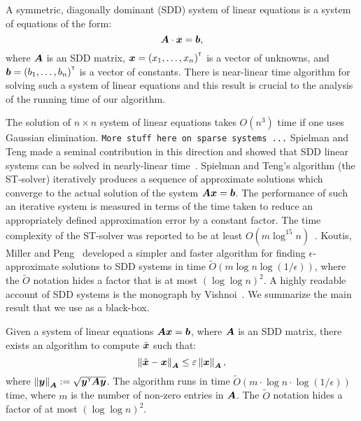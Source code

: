 A symmetric, diagonally dominant (SDD) system of linear equations is a system of 
equations of the form:
\[
	\boldsymbol{A} \cdot \boldsymbol{x} = \boldsymbol{b},
\]
where $\boldsymbol{A}$ is an SDD matrix, $\boldsymbol{x} = {(x_1, \ldots, x_n)}^{\scriptscriptstyle \mathsf{T}}$ 
is a vector of unknowns, and $\boldsymbol{b} = {(b_1, \ldots, b_n)}^{\scriptscriptstyle \mathsf{T}}$ is a vector of constants. 
There is near-linear time algorithm for solving such a system of linear equations 
and this result is crucial to the analysis of the running time of our algorithm. 

The solution of $n \times n$ system of linear equations takes $O(n^3)$ time 
if one uses Gaussian elimination. \texttt{More stuff here on sparse systems ...}
Spielman and Teng made a seminal contribution in this direction and 
showed that SDD linear systems can be solved in nearly-linear 
time~\cite{ST04,EEST05,ST08}. Spielman and Teng's algorithm (the ST-solver)
iteratively produces a sequence of approximate solutions which converge to the 
actual solution of the system $\boldsymbol{A} \boldsymbol{x} = \boldsymbol{b}$. The performance 
of such an iterative system is measured in terms of the time taken to reduce 
an appropriately defined approximation error by a constant factor. The time 
complexity of the ST-solver was reported to be at least $O(m \log^{15} n)$~\cite{KMP11}.  
Koutis, Miller and Peng~\cite{KMP10,KMP11} developed a simpler and faster algorithm 
for finding $\epsilon$-approximate solutions to SDD systems in time 
$\tilde{O}(m \log n \log (1/\epsilon) )$, where the $\tilde{O}$ notation hides 
a factor that is at most $(\log \log n)^2$. A highly readable account 
of SDD systems is the monograph by Vishnoi~\cite{Vis13}. We summarize the 
main result that we use as a black-box.  
\begin{proposition} \label{prop:SDD_systems} {\textrm{\cite{KMP11,Vis13}}}
	Given a system of linear equations $\boldsymbol{A} \boldsymbol{x} = \boldsymbol{b}$, where $\boldsymbol{A}$
	is an SDD matrix, there exists an algorithm to compute $\tilde{\boldsymbol{x}}$  
	such that:
		\[
			\left \| \tilde{\boldsymbol{x}} - \boldsymbol{x} \right \|_{\boldsymbol{A}} \leq \varepsilon \left \| \boldsymbol{x} \right \|_{\boldsymbol{A}}, 
		\]
	where $\left \| \boldsymbol{y} \right \|_{\boldsymbol{A}} := \sqrt{{\boldsymbol{y}}^{\scriptscriptstyle \mathsf{T}} \boldsymbol{A} \boldsymbol{y}}$. The algorithm runs in 
	time $\tilde{O}(m \cdot \log n \cdot \log (1 / \epsilon) )$ time, where $m$ is the number of non-zero 
	entries in $\boldsymbol{A}$. The $\tilde{O}$ notation hides a factor of at most $(\log \log n)^2$.
\end{proposition} 

